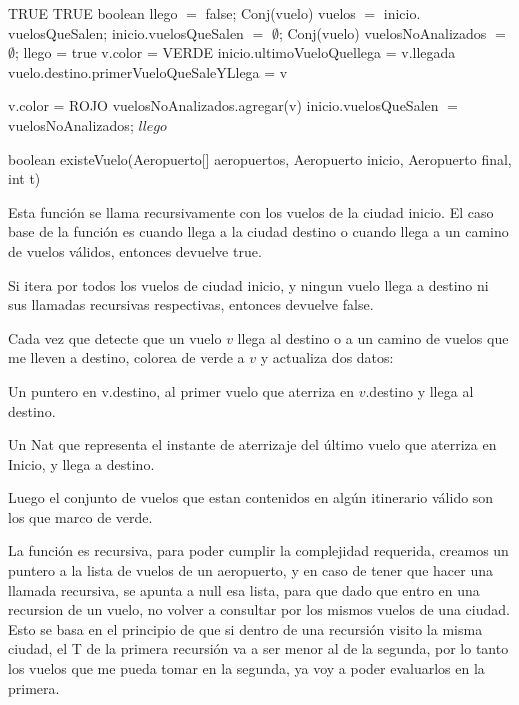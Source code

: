\begin{algorithm}[H]
\begin{algorithmic}[1]
		\RETURN TRUE
\ENDIF
{}	
		\RETURN TRUE
\ENDIF
\STATE boolean llego $=$ false;
\STATE Conj(vuelo) vuelos $=$ inicio$.$vuelosQueSalen;
\STATE inicio$.$vuelosQueSalen $=$ $\emptyset$;
\STATE Conj(vuelo) vuelosNoAnalizados $=$ $\emptyset$;
				\STATE llego = true
				\STATE v.color = VERDE
					\STATE inicio.ultimoVueloQuellega = v.llegada
				\ENDIF
					\STATE vuelo.destino.primerVueloQueSaleYLlega = v
				\ENDIF

			\ELSE
				\STATE v.color = ROJO								
	    		\ENDIF    			
		\ENDIF
	\ELSE
		\STATE vuelosNoAnalizados.agregar(v)										    
    \ENDIF
\ENDFOR
\STATE inicio$.$vuelosQueSalen $=$ vuelosNoAnalizados;
\RETURN $llego$
\caption{boolean existeVuelo(Aeropuerto[] aeropuertos, Aeropuerto inicio, Aeropuerto final, int t)}%
\end{algorithmic}
\end{algorithm}

Esta funci\'on se llama recursivamente con los vuelos de la ciudad inicio. El caso base de la funci\'on es cuando llega a la ciudad destino o cuando llega a un camino de vuelos v\'alidos, entonces devuelve true.

Si itera por todos los vuelos de ciudad inicio, y ningun vuelo llega a destino ni sus llamadas recursivas respectivas, entonces devuelve false.

Cada vez que detecte que un vuelo $v$ llega al destino o a un camino de vuelos que me lleven a destino, colorea de verde a $v$ y actualiza dos datos:

Un puntero en v.destino, al primer vuelo que aterriza en $v$.destino y llega al destino.

Un Nat que representa el instante de aterrizaje del \'ultimo vuelo que aterriza en Inicio, y llega a destino.

Luego el conjunto de vuelos que estan contenidos en alg\'un itinerario v\'alido son los que marco de verde.

La funci\'on es recursiva, para poder cumplir la complejidad requerida, creamos un puntero a la lista de vuelos de un aeropuerto, y en caso de tener que hacer una llamada recursiva, se apunta a null esa lista, para que dado que entro en una recursion de un vuelo, no volver a consultar por los mismos vuelos de una ciudad. Esto se basa en el principio de que si dentro de una recursi\'on visito la misma ciudad, el T de la primera recursi\'on va a ser menor al de la segunda, por lo tanto los vuelos que me pueda tomar en la segunda, ya voy a poder evaluarlos en la primera.

